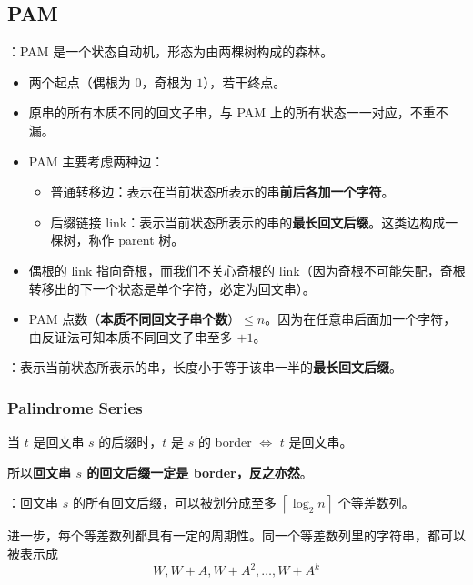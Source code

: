 
\subsection{PAM}

：PAM 是一个状态自动机，形态为由两棵树构成的森林。

\begin{itemize}
    \item 两个起点（偶根为 $0$，奇根为 $1$），若干终点。
    \item 原串的所有本质不同的回文子串，与 PAM 上的所有状态一一对应，不重不漏。
    \item PAM 主要考虑两种边：
    \begin{itemize}
        \item 普通转移边：表示在当前状态所表示的串\textbf{前后各加一个字符}。
        \item 后缀链接 link：表示当前状态所表示的串的\textbf{最长回文后缀}。这类边构成一棵树，称作 parent 树。
    \end{itemize}
    \item 偶根的 link 指向奇根，而我们不关心奇根的 link（因为奇根不可能失配，奇根转移出的下一个状态是单个字符，必定为回文串）。
    \item PAM 点数（\textbf{本质不同回文子串个数}）$\leq n$。因为在任意串后面加一个字符，由反证法可知本质不同回文子串至多 $+1$。
\end{itemize}


：表示当前状态所表示的串，长度小于等于该串一半的\textbf{最长回文后缀}。


\subsubsection{Palindrome Series}

当 $t$ 是回文串 $s$ 的后缀时，$t$ 是 $s$ 的 border $\iff$ $t$ 是回文串。

所以\textbf{回文串 $s$ 的回文后缀一定是 border，反之亦然}。

：回文串 $s$ 的所有回文后缀，可以被划分成至多 $\left\lceil \log_2 n \right\rceil$ 个等差数列。

进一步，每个等差数列都具有一定的周期性。同一个等差数列里的字符串，都可以被表示成
\[
W, W + A, W + A^2, \dots, W + A^k
\]

